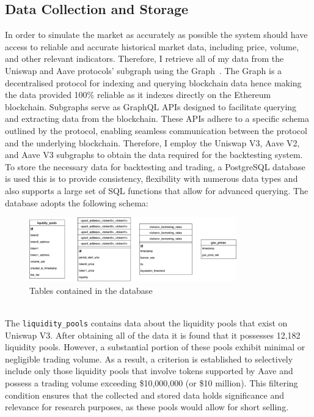 \subsection{Data Collection and Storage}
In order to simulate the market as accurately as possible the system should have access to reliable and accurate historical market data, including price, volume, and other relevant indicators. Therefore, I retrieve all of my data from the Uniswap and Aave protocols' subgraph using the Graph~\cite{noauthor_graph_nodate}. The Graph is a decentralised protocol for indexing and querying blockchain data hence making the data provided 100\% reliable as it indexes directly on the Ethereum blockchain. Subgraphs serve as GraphQL APIs designed to facilitate querying and extracting data from the blockchain. These APIs adhere to a specific schema outlined by the protocol, enabling seamless communication between the protocol and the underlying blockchain. Therefore, I employ the Uniswap V3, Aave V2, and Aave V3 subgraphs to obtain the data required for the backtesting system.
\\[3mm]
To store the necessary data for backtesting and trading, a PostgreSQL database is used this is to provide consistency, flexibility with numerous data types and also supports a large set of SQL functions that allow for advanced querying. The database adopts the following schema:
\begin{figure}[!htb]
    \centering
    \includegraphics[width=0.8\textwidth]{project/Images/database_tables.png}
    \caption{Tables contained in the database \label{fig:database}}
\end{figure}
\\[3mm]
The \texttt{liquidity\_pools} contains data about the liquidity pools that exist on Uniswap V3. After obtaining all of the data it is found that it possesses 12,182 liquidity pools. However, a substantial portion of these pools exhibit minimal or negligible trading volume. As a result, a criterion is established to selectively include only those liquidity pools that involve tokens supported by Aave and possess a trading volume exceeding \$10,000,000 (or \$10 million). This filtering condition ensures that the collected and stored data holds significance and relevance for research purposes, as these pools would allow for short selling.
